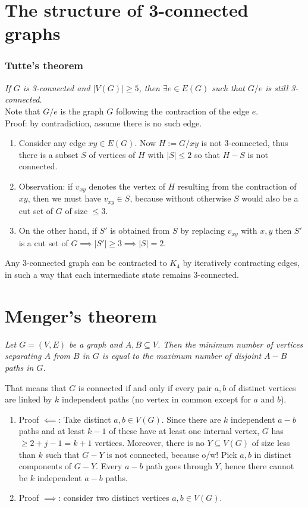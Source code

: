 \documentclass[11pt]{book}
\begin{document}
		
	\section{The structure of 3-connected graphs}
		\subsubsection{Tutte's theorem} 
		\textit{If $G$ is 3-connected and $|V(G)| \geq 5$, then $\exists e \in E (G)$ such that $G / e$ is still 3-connected.}\\
		
		Note that $G / e$ is the graph $G$ following the contraction of the edge $e$.\\
		
		Proof: by contradiction, assume there is no such edge.
		\begin{enumerate}
			\item Consider any edge $xy \in E(G)$. Now $H := G / xy$ is not 3-connected, thus there is a subset $S$ of vertices of $H$ with $|S| \leq 2$ so that $H - S$ is not connected. 
			\item Observation: if $v_{xy}$ denotes the vertex of $H$ resulting from the contraction of $xy$, then we must have $v_{xy} \in S$, because without otherwise $S$ would also be a cut set of $G$ of size $\leq 3$.
			\item On the  other hand, if $S'$ is obtained from $S$ by replacing $v_{xy}$ with $x,y$ then $S'$ is a cut set of $G \implies |S'| \geq 3 \implies |S| = 2$.
		\end{enumerate}
		
		Any 3-connected graph can be contracted to $K_4$ by iteratively contracting edges, in such a way that each intermediate state remains 3-connected.
		
		
	\section{Menger's theorem}
		\textit{Let $G = (V,E)$ be a graph and $A, B \subseteq V$. Then the minimum number of vertices separating $A$ from $B$ in $G$ is equal to the maximum number of disjoint $A-B$ paths in $G$.\\}
		
		That means that $G$ is connected if and only if every pair $a,b$ of distinct vertices are linked by $k$ independent paths (no vertex in common except for $a$ and $b$). 
		
		\begin{enumerate}
			\item Proof $\impliedby$: Take distinct $a ,b \in V(G)$. Since there are $k$ independent $a-b$ paths and at least $k-1$ of these have at least one internal vertex, $G$ has $\geq 2 + j - 1 = k + 1$ vertices. Moreover, there is no $Y \subseteq V(G)$ of size less than $k$ such that $G - Y$ is not connected, because o/w! Pick $a,b$ in distinct components of $G - Y$. Every $a-b$ path goes through $Y$, hence there cannot be $k$ independent $a-b$ paths.
			\item Proof $\implies$: consider two distinct vertices $a,b \in V(G)$. 
		\end{enumerate}
		
\end{document}
